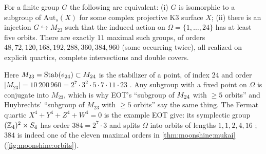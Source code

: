 \begin{theorem}[Mukai]\label{thm:moonshine:mukai}\TL\;
For a finite group $G$ the following are equivalent: (i) $G$ is isomorphic to a subgroup of
$\mathrm{Aut}_s(X)$ for some complex projective K3 surface $X$; (ii) there is an injection
$G\hookrightarrow M_{23}$ such that the induced action on $\Omega=\{1,\dots,24\}$ has at least
five orbits. There are exactly $11$ maximal such groups, of orders
$48,72,120,168,192,288,360,384,960$ (some occurring twice), all realized on explicit
quartics, complete intersections and double covers.
\end{theorem}

Here $M_{23}=\mathrm{Stab}(e_{24})\subset M_{24}$ is the stabilizer of a point, of index $24$
and order $|M_{23}|=10\,200\,960=2^7\cdot3^2\cdot5\cdot7\cdot11\cdot23$
. Any subgroup with a fixed point on $\Omega$ is
conjugate into $M_{23}$, which is why EOT's ``subgroup of $M_{24}$ with $\ge5$ orbits'' and
Huybrechts' ``subgroup of $M_{23}$ with $\ge5$ orbits'' say the same thing. The Fermat
quartic $X^4+Y^4+Z^4+W^4=0$ is the example EOT give: its symplectic group
$(\mathbb{Z}_4)^2\rtimes S_4$ has order $384=2^7\cdot3$ and splits $\Omega$ into orbits of
lengths $1,1,2,4,16$ ; $384$ is indeed one of the eleven
maximal orders in \cref{thm:moonshine:mukai} (\cref{fig:moonshine:orbits}).

